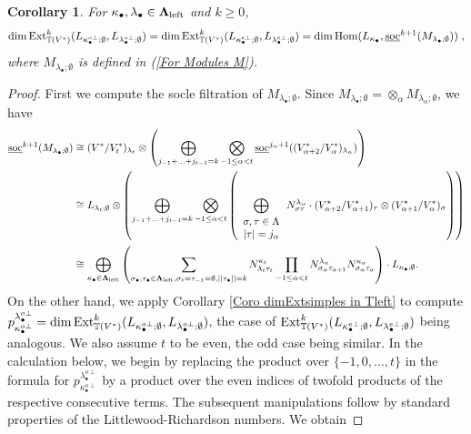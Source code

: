 \documentclass[12pt]{article}
\def\TT {{\mathbb T}}     %
\def\ul  {\underline}
\newtheorem{coro}[theorem]{Corollary}
\begin{document}
\begin{coro}\label{Coro Ext to Hom in TVstar}
For $\kappa_\bullet,\lambda_\bullet\in\bm\Lambda_{\rm left}$ and $k\geq0$,
$$
\dim {\rm Ext}_{\TT(V^*)}^k (L_{\kappa_\bullet^{o\perp};\emptyset},L_{\lambda_\bullet^{o\perp};\emptyset}) = \dim {\rm Ext}_{\TT(V^*)}^k (L_{\kappa_\bullet^{e\perp};\emptyset},L_{\lambda_\bullet^{e\perp};\emptyset}) = \dim {\rm Hom}(L_{\kappa_\bullet},\ul{\rm soc}^{k+1}(M_{\lambda_\bullet;\emptyset}))\;,
$$
where $M_{\lambda_\bullet;\emptyset}$ is defined in (\ref{For Modules M}).
\end{coro}

\begin{proof}
First we compute the socle filtration of $M_{\lambda_\bullet;\emptyset}$. Since $M_{\lambda_\bullet;\emptyset}=\otimes_\alpha M_{\lambda_\alpha;\emptyset}$, we have
\begin{align*}
\ul{\rm soc}^{k+1}(M_{\lambda_\bullet;\emptyset})& \cong (V^*/V^*_{t})_{\lambda_t}\otimes \left( \bigoplus\limits_{j_{-1}+...+j_{t-1}=k} \bigotimes\limits_{-1\leq\alpha<t} \ul{\rm soc}^{j_\alpha+1}((V^*_{\alpha+2}/V^*_{\alpha})_{\lambda_\alpha})\right)\\
& \cong L_{\lambda_t;\emptyset}\otimes \left( \bigoplus\limits_{j_{-1}+...+j_{t-1}=k} \bigotimes\limits_{-1\leq\alpha<t} \left( \bigoplus\limits_{\begin{array}{c}\sigma,\tau\in\Lambda\\ |\tau|=j_\alpha\end{array}}  N^{\lambda_\alpha}_{\sigma \tau} \cdot (V^*_{\alpha+2}/V^*_{\alpha+1})_{\tau} \otimes (V^*_{\alpha+1}/V^*_{\alpha})_{\sigma} \right)\right)\\
& \cong \bigoplus\limits_{\kappa_\bullet\in\bm\Lambda_{\rm left}} \left(\sum\limits_{\sigma_\bullet,\tau_\bullet\in\bm\Lambda_{\rm left},\sigma_t=\tau_{-1}=\emptyset,||\tau_\bullet||=k} N^{\kappa_t}_{\lambda_t \tau_t} \prod\limits_{-1\leq\alpha<t} N^{\lambda_\alpha}_{\sigma_\alpha \tau_{\alpha+1}} N^{\kappa_\alpha}_{\sigma_\alpha \tau_\alpha} \right)\cdot L_{\kappa_\bullet;\emptyset}.
\end{align*}
On the other hand, we apply Corollary \ref{Coro dimExtsimples in Tleft} to compute $p^{\lambda_\bullet^{o\perp}}_{\kappa_\bullet^{o\perp}}=\dim{\rm Ext}_{\TT(V^*)}^k (L_{\kappa_\bullet^{o\perp};\emptyset},L_{\lambda_\bullet^{o\perp};\emptyset})$, the case of ${\rm Ext}_{\TT(V^*)}^k (L_{\kappa_\bullet^{e\perp};\emptyset},L_{\lambda_\bullet^{e\perp};\emptyset})$ being analogous. We also assume $t$ to be even, the odd case being similar. In the calculation below, we begin by replacing the product over $\{-1,0,...,t\}$ in the formula for $p^{\lambda_\bullet^{o\perp}}_{\kappa_\bullet^{o\perp}}$ by a product over the even indices of twofold products of the respective consecutive terms. The subsequent manipulations follow by standard properties of the Littlewood-Richardson numbers. We obtain

\end{proof}
\end{document}
